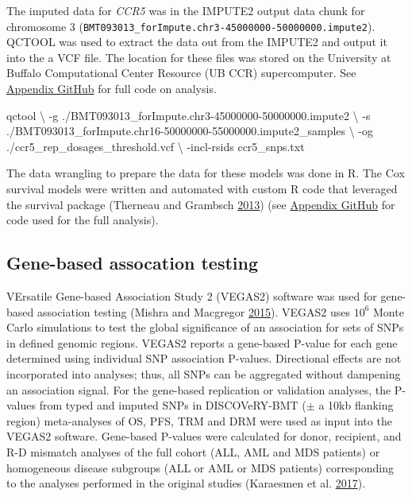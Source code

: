 \documentclass[]{DissertateOSU}
\newenvironment{Shaded}{\begin{snugshade}}{\end{snugshade}}
\newcommand{\DataTypeTok}[1]{\textcolor[rgb]{0.13,0.29,0.53}{#1}}
\newcommand{\ExtensionTok}[1]{#1}
\newcommand{\NormalTok}[1]{#1}
\begin{document}
\noindent The imputed data for \emph{CCR5} was in the IMPUTE2 output
data chunk for chromosome 3
(\texttt{BMT093013\_forImpute.chr3-45000000-50000000.impute2}). QCTOOL
was used to extract the data out from the IMPUTE2 and output it into the
a VCF file. The location for these files was stored on the University at
Buffalo Computational Center Resource (UB CCR) supercomputer. See
\href{https://github.com/aarizvi/dissertation/tree/master/code/chapter2}{Appendix
GitHub} for full code on analysis.

\singlespacing

\begin{Shaded}
\begin{Highlighting}[]
\ExtensionTok{qctool} \DataTypeTok{\textbackslash{} }
    \ExtensionTok{-g}\NormalTok{ ./BMT093013_forImpute.chr3-45000000-50000000.impute2 \textbackslash{}}
\NormalTok{    -s ./BMT093013_forImpute.chr16-50000000-55000000.impute2_samples \textbackslash{}}
\NormalTok{    -og ./ccr5_rep_dosages_threshold.vcf \textbackslash{}}
\NormalTok{    -incl-rsids ccr5_snps.txt }
\end{Highlighting}
\end{Shaded}

\doublespacing
\noindent The data wrangling to prepare the data for these models was
done in R. The Cox survival models were written and automated with
custom R code that leveraged the survival package (Therneau and Grambsch
\protect\hyperlink{ref-therneau2013}{2013}) (see
\href{https://github.com/aarizvi/dissertation/tree/master/code/chapter2}{Appendix
GitHub} for code used for the full analysis).

\subsection{Gene-based assocation
testing}\label{gene-based-assocation-testing}

VErsatile Gene-based Association Study 2 (VEGAS2) software was used for
gene-based association testing (Mishra and Macgregor
\protect\hyperlink{ref-Mishra_2015}{2015}). VEGAS2 uses \(10^{6}\) Monte
Carlo simulations to test the global significance of an association for
sets of SNPs in defined genomic regions. VEGAS2 reports a gene-based
P-value for each gene determined using individual SNP association
P-values. Directional effects are not incorporated into analyses; thus,
all SNPs can be aggregated without dampening an association signal. For
the gene-based replication or validation analyses, the P-values from
typed and imputed SNPs in DISCOVeRY-BMT (\(\pm\) a 10kb flanking region)
meta-analyses of OS, PFS, TRM and DRM were used as input into the VEGAS2
software. Gene-based P-values were calculated for donor, recipient, and
R-D mismatch analyses of the full cohort (ALL, AML and MDS patients) or
homogeneous disease subgroups (ALL or AML or MDS patients) corresponding
to the analyses performed in the original studies (Karaesmen et al.
\protect\hyperlink{ref-Karaesmen_2017}{2017}).
\end{document}
